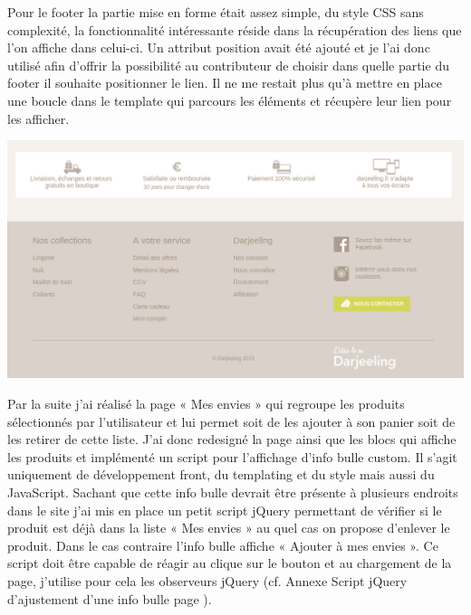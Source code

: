 \documentclass[a4paper,11pt,twoside]{report}
\begin{document}
	Pour le footer la partie mise en forme était assez simple, du style CSS sans complexité, la fonctionnalité intéressante réside dans la récupération des liens que l'on affiche dans celui-ci. Un attribut position avait été ajouté et je l'ai donc utilisé afin d'offrir la possibilité au contributeur de choisir dans quelle partie du footer il souhaite positionner le lien. Il ne me restait plus qu'à mettre en place une boucle dans le template qui parcours les éléments et récupère leur lien pour les afficher.
	\label{footer_recuperation_darjeeling}
	
	
	\begin{center}
	  \includegraphics[width=\textwidth]{images/darjeeling_footer.png} 
	  \label{darjeeling_footer}
	\end{center}
	
	Par la suite j'ai réalisé la page « Mes envies » qui regroupe les produits sélectionnés par l'utilisateur et lui permet soit de les ajouter à son panier soit de les retirer de cette liste. J'ai donc redesigné la page ainsi que les blocs qui affiche les produits et implémenté un script pour l'affichage d'info bulle custom. Il s'agit uniquement de développement front, du templating et du style mais aussi du JavaScript. Sachant que cette info bulle devrait être présente à plusieurs endroits dans le site j'ai mis en place un petit script jQuery permettant de vérifier si le produit est déjà dans la liste « Mes envies » au quel cas on propose d'enlever le produit. Dans le cas contraire l'info bulle affiche « Ajouter à mes envies ». Ce script doit être capable de réagir au clique sur le bouton et au chargement de la page, j'utilise pour cela les observeurs jQuery (cf. Annexe Script jQuery d'ajustement d'une info bulle page \pageref{script_jQuery_d_ajustement_d_une_info_bulle}).
	
\end{document}
